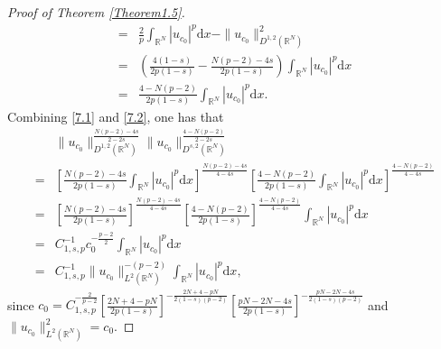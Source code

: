 \documentclass[12pt,a4paper,reqno]{amsart}
\numberwithin{equation}{section}
\begin{document}
\begin{proof}[Proof of Theorem \ref{Theorem1.5}]
\begin{equation}
\begin{aligned}
=&
\frac{2}{p}
\int_{\mathbb{R}^{N}}
|u_{c_{0}}|^{p}
\mathrm{d}x
-\|u_{c_{0}}\|_{D^{1,2}(\mathbb{R}^{N})}^{2}\\
=&
\left(
\frac{4(1-s)}{2p(1-s)}
-\frac{N(p-2)-4s}{2p(1-s)}
\right)
\int_{\mathbb{R}^{N}}
|u_{c_{0}}|^{p}
\mathrm{d}x\\
=&
\frac{4-N(p-2)}{2p(1-s)}
\int_{\mathbb{R}^{N}}
|u_{c_{0}}|^{p}
\mathrm{d}x.
\end{aligned}
\end{equation}
Combining \eqref{7.1} and \eqref{7.2}, one has that
\begin{equation*}
\begin{aligned}
&\|u_{c_{0}}\|_{D^{1,2}(\mathbb{R}^{N})}^{\frac{N(p-2)-4s}{2-2s}}
\|u_{c_{0}}\|_{D^{s,2}(\mathbb{R}^{N})}^{\frac{4-N(p-2)}{2-2s}}\\
=&
\left[
\frac{N(p-2)-4s}{2p(1-s)}
\int_{\mathbb{R}^{N}}
|u_{c_{0}}|^{p}
\mathrm{d}x
\right]^{\frac{N(p-2)-4s}{4-4s}}
\left[
\frac{4-N(p-2)}{2p(1-s)}
\int_{\mathbb{R}^{N}}
|u_{c_{0}}|^{p}
\mathrm{d}x
\right]^{\frac{4-N(p-2)}{4-4s}}
\\
=&
\left[
\frac{N(p-2)-4s}{2p(1-s)}
\right]^{\frac{N(p-2)-4s}{4-4s}}
\left[
\frac{4-N(p-2)}{2p(1-s)}
\right]^{\frac{4-N(p-2)}{4-4s}}
\int_{\mathbb{R}^{N}}
|u_{c_{0}}|^{p}
\mathrm{d}x\\
=&
C_{1,s,p}^{-1}
c_{0}^{-\frac{p-2}{2}}
\int_{\mathbb{R}^{N}}
|u_{c_{0}}|^{p}
\mathrm{d}x\\
=&
C_{1,s,p}^{-1}\|u_{c_{0}}\|_{L^{2}(\mathbb{R}^{N})}^{-(p-2)}
\int_{\mathbb{R}^{N}}
|u_{c_{0}}|^{p}
\mathrm{d}x,
\end{aligned}
\end{equation*}
since $c_{0}=C_{1,s,p}^{-\frac{2}{p-2}}
\left[
\frac{2N+4-pN}{2p(1-s)}
\right]^{-\frac{2N+4-pN}{2(1-s)(p-2)}}
\left[
\frac{pN-2N-4s}{2p(1-s)}
\right]^{-\frac{pN-2N-4s}{2(1-s)(p-2)}}$ and $\|u_{c_{0}}\|_{L^{2}(\mathbb{R}^{N})}^{2}=c_{0}$.
\end{proof}
\end{document}
